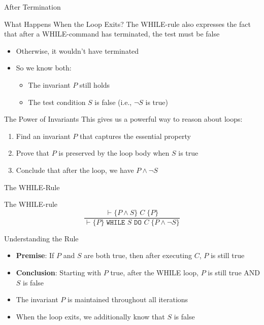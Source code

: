 \begin{frame}{After Termination}
    \begin{block}{What Happens When the Loop Exits?}
        The WHILE-rule also expresses the fact that after a WHILE-command has terminated, the test must be false
        \begin{itemize}
            \item Otherwise, it wouldn't have terminated
            \item So we know both:
            \begin{itemize}
                \item The invariant $P$ still holds
                \item The test condition $S$ is false (i.e., $\neg S$ is true)
            \end{itemize}
        \end{itemize}
    \end{block}
    
    \begin{block}{The Power of Invariants}
        This gives us a powerful way to reason about loops:
        \begin{enumerate}
            \item Find an invariant $P$ that captures the essential property
            \item Prove that $P$ is preserved by the loop body when $S$ is true
            \item Conclude that after the loop, we have $P \wedge \neg S$
        \end{enumerate}
    \end{block}
\end{frame}

\begin{frame}{The WHILE-Rule}
    \begin{block}{The WHILE-rule}
        \[ \frac{\vdash \{P \wedge S\} \; C \; \{P\}}{\vdash \{P\} \; \texttt{WHILE } S \texttt{ DO } C \; \{P \wedge \neg S\}} \]
    \end{block}
    
    \begin{block}{Understanding the Rule}
        \begin{itemize}
            \item \textbf{Premise}: If $P$ and $S$ are both true, then after executing $C$, $P$ is still true
            \item \textbf{Conclusion}: Starting with $P$ true, after the WHILE loop, $P$ is still true AND $S$ is false
            \item The invariant $P$ is maintained throughout all iterations
            \item When the loop exits, we additionally know that $S$ is false
        \end{itemize}
    \end{block}
\end{frame}

